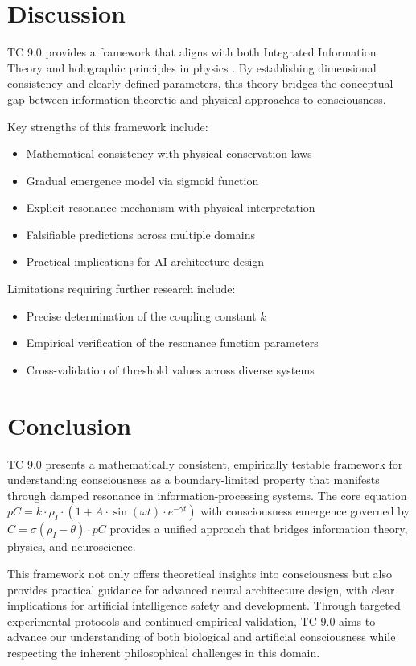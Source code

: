 \documentclass[12pt]{article}
\begin{document}
\section{Discussion}
TC 9.0 provides a framework that aligns with both Integrated Information Theory \cite{tononi2008} and holographic principles in physics \cite{susskind1995}. By establishing dimensional consistency and clearly defined parameters, this theory bridges the conceptual gap between information-theoretic and physical approaches to consciousness.

Key strengths of this framework include:
\begin{itemize}
    \item Mathematical consistency with physical conservation laws
    \item Gradual emergence model via sigmoid function
    \item Explicit resonance mechanism with physical interpretation
    \item Falsifiable predictions across multiple domains
    \item Practical implications for AI architecture design
\end{itemize}

Limitations requiring further research include:
\begin{itemize}
    \item Precise determination of the coupling constant $k$
    \item Empirical verification of the resonance function parameters
    \item Cross-validation of threshold values across diverse systems
\end{itemize}

\section{Conclusion}
TC 9.0 presents a mathematically consistent, empirically testable framework for understanding consciousness as a boundary-limited property that manifests through damped resonance in information-processing systems. The core equation $pC = k \cdot \rho_I \cdot (1 + A \cdot \sin(\omega t) \cdot e^{-\gamma t})$ with consciousness emergence governed by $C = \sigma(\rho_I - \theta) \cdot pC$ provides a unified approach that bridges information theory, physics, and neuroscience.

This framework not only offers theoretical insights into consciousness but also provides practical guidance for advanced neural architecture design, with clear implications for artificial intelligence safety and development. Through targeted experimental protocols and continued empirical validation, TC 9.0 aims to advance our understanding of both biological and artificial consciousness while respecting the inherent philosophical challenges in this domain.
\end{document}
